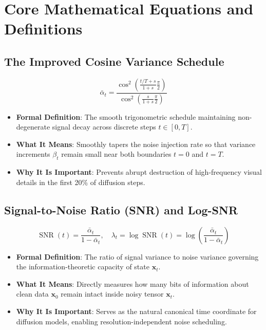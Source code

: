 \documentclass[11pt,a4paper]{article}
\theoremstyle{definition}
\begin{document}
\section{Core Mathematical Equations and Definitions}

\subsection{The Improved Cosine Variance Schedule}
{\boldmath
\begin{equation}
\bar{\alpha}_t = \frac{\cos^2\left( \frac{t/T + s}{1 + s} \frac{\pi}{2} \right)}{\cos^2\left( \frac{s}{1 + s} \frac{\pi}{2} \right)}
\end{equation}
}
\begin{itemize}
    \item \textbf{Formal Definition}: The smooth trigonometric schedule maintaining non-degenerate signal decay across discrete steps $t \in [0, T]$.
    \item \textbf{What It Means}: Smoothly tapers the noise injection rate so that variance increments $\beta_t$ remain small near both boundaries $t = 0$ and $t = T$.
    \item \textbf{Why It Is Important}: Prevents abrupt destruction of high-frequency visual details in the first 20\% of diffusion steps.
\end{itemize}

\subsection{Signal-to-Noise Ratio (SNR) and Log-SNR}
{\boldmath
\begin{equation}
\operatorname{SNR}(t) = \frac{\bar{\alpha}_t}{1 - \bar{\alpha}_t}, \quad \lambda_t = \log \operatorname{SNR}(t) = \log\left(\frac{\bar{\alpha}_t}{1 - \bar{\alpha}_t}\right)
\end{equation}
}
\begin{itemize}
    \item \textbf{Formal Definition}: The ratio of signal variance to noise variance governing the information-theoretic capacity of state $\mathbf{x}_t$.
    \item \textbf{What It Means}: Directly measures how many bits of information about clean data $\mathbf{x}_0$ remain intact inside noisy tensor $\mathbf{x}_t$.
    \item \textbf{Why It Is Important}: Serves as the natural canonical time coordinate for diffusion models, enabling resolution-independent noise scheduling.
\end{itemize}
\end{document}
